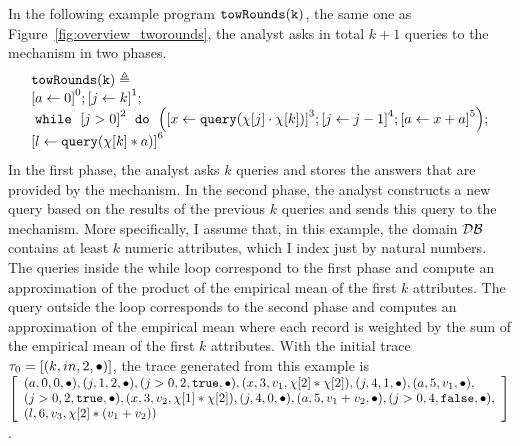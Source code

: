 \begin{example}
    In the following example program $\mathtt{towRounds(k)}$, the same one as Figure~\ref{fig:overview_tworounds},
    the analyst asks in total $k+1$ queries to the mechanism in two phases.
    \[         \begin{array}{l}
      \kw{towRounds(k)} \triangleq \\
             \clabel{ \assign{a}{0}}^{0} ;
              \clabel{\assign{j}{k} }^{1} ;\\
              \ewhile ~ \clabel{j > 0}^{2} ~ \edo ~
              \Big(
               \clabel{\assign{x}{\query(\chi[j] \cdot \chi[k])} }^{3}  ;
               \clabel{\assign{j}{j-1}}^{4} ;
              \clabel{\assign{a}{x + a}}^{5}       \Big);\\
              \clabel{\assign{l}{\query(\chi[k]*a)} }^{6}
          \end{array}
          \]
    In the first phase, the analyst asks $k$ queries and stores the answers that are provided by the mechanism. 
    In the second phase, the analyst constructs a new query based on the results of the previous $k$ queries and sends this query to the mechanism. More specifically, I assume that, in this example, the domain $\mathcal{DB}$ 
    contains at least $k$ numeric attributes, which I index just by natural numbers. 
    The queries inside the while loop correspond to the first phase and compute an approximation of 
    the product of the empirical mean of the first $k$ attributes. 
    The query outside the loop corresponds to the second phase and computes an approximation of the empirical mean where each record is weighted by the sum of the empirical mean of the first $k$ attributes.
    With the initial trace
    $\mathtt{\tau}_0 = [(k, in, 2, \bullet)]$,
    the trace generated from this example is 
   \\
    $
    \left[\begin{array}{l}
     (a, 0, 0, \bullet),
    (j, 1, 2, \bullet),
    (j>0, 2, \etrue, \bullet),
    (x, 3, v_1, \chi[2]*\chi[2]),
    (j, 4, 1, \bullet),
    (a, 5, v_1, \bullet),\\
    (j>0, 2, \etrue, \bullet),
    (x, 3, v_2, \chi[1]*\chi[2]),
    (j, 4, 0, \bullet),
    (a, 5, v_1 + v_2, \bullet),
    (j>0, 4, \efalse, \bullet),\\
    (l, 6, v_3, \chi[2]*( v_1 + v_2))
    \end{array} \right]
    $.
\end{example}